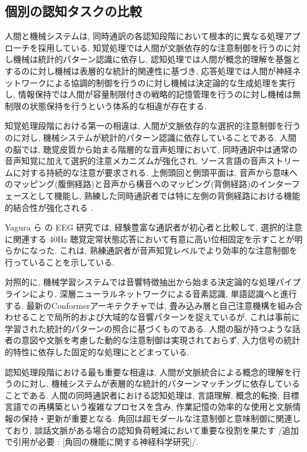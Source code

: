 \subsection{個別の認知タスクの比較}

人間と機械システムは, 同時通訳の各認知段階において根本的に異なる処理アプローチを採用している.
知覚処理では人間が文脈依存的な注意制御を行うのに対し機械は統計的パターン認識に依存し, 認知処理では人間が概念的理解を基盤とするのに対し機械は表層的な統計的関連性に基づき, 応答処理では人間が神経ネットワークによる協調的制御を行うのに対し機械は決定論的な生成処理を実行し, 情報保持では人間が容量制限付きの戦略的記憶管理を行うのに対し機械は無制限の状態保持を行うという体系的な相違が存在する.

知覚処理段階における第一の相違は, 人間が文脈依存的な選択的注意制御を行うのに対し, 機械システムが統計的パターン認識に依存していることである.
人間の脳では, 聴覚皮質から始まる階層的な音声処理において, 同時通訳中は通常の音声知覚に加えて選択的注意メカニズムが強化され, ソース言語の音声ストリームに対する持続的な注意が要求される.
上側頭回と側頭平面は, 音声から意味へのマッピング(腹側経路)と音声から構音へのマッピング(背側経路)のインターフェースとして機能し, 熟練した同時通訳者では特に左側の背側経路における機能的結合性が強化される \cite{elmer2016functional}.

Yagura ら \cite{yagura2021selective} の EEG 研究では, 経験豊富な通訳者が初心者と比較して, 選択的注意に関連する 40Hz 聴覚定常状態応答において有意に高い位相固定を示すことが明らかになった.
これは, 熟練通訳者が音声知覚レベルでより効率的な注意制御を行っていることを示している.

対照的に, 機械学習システムでは音響特徴抽出から始まる決定論的な処理パイプラインにより, 深層ニューラルネットワークによる音素認識, 単語認識へと進行する.
最新のConformerアーキテクチャでは, 畳み込み層と自己注意機構を組み合わせることで局所的および大域的な音響パターンを捉えているが, これは事前に学習された統計的パターンの照合に基づくものである.
人間の脳が持つような話者の意図や文脈を考慮した動的な注意制御は実現されておらず, 入力信号の統計的特性に依存した固定的な処理にとどまっている.

認知処理段階における最も重要な相違は, 人間が文脈統合による概念的理解を行うのに対し, 機械システムが表層的な統計的パターンマッチングに依存していることである.
人間の同時通訳者における認知処理は, 言語理解, 概念的転換, 目標言語での再構築という複雑なプロセスを含み, 作業記憶の効率的な使用と文脈情報の保持・更新が重要となる.
角回は超モダールな注意制御と意味制御に関連しており, 談話文脈がある場合の認知負荷軽減において重要な役割を果たす {/追加で引用が必要 : [角回の機能に関する神経科学研究]/}.

